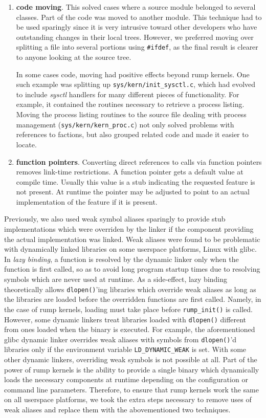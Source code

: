 \begin{enumerate}
\item   \textbf{code moving}.  This solved cases where a source
	module belonged to several classes.  Part of the code was
	moved to another module.  This technique had to be used
	sparingly since it is very intrusive toward other developers
	who have outstanding changes in their local trees.  However,
	we preferred moving over splitting a file into several
	portions using \texttt{\#ifdef}, as the final result is
	clearer to anyone looking at the source tree.

	In some cases code, moving had positive effects beyond rump
	kernels.  One such example was splitting up
	\verb+sys/kern/init_sysctl.c+, which had evolved to include
	\textit{sysctl} handlers for many different pieces of
	functionality.  For example, it contained the routines
	necessary to retrieve a process listing.  Moving the process
	listing routines to the source file dealing with process
	management (\verb+sys/kern/kern_proc.c+) not only solved
	problems with references to factions, but also
	grouped related code and made it easier to locate.

\item   \textbf{function pointers}.  Converting direct references
	to calls via function pointers removes link-time restrictions.
	A function pointer gets a default value at compile time.
	Usually this value is a stub indicating the requested feature is
	not present.  At runtime the pointer may be adjusted to
	point to an actual implementation of the feature if it is
	present.
\end{enumerate}

Previously, we also used weak symbol aliases sparingly to provide stub
implementations which were overriden by the linker if the component
providing the actual implementation was linked.  Weak aliases were
found to be problematic with dynamically linked libraries on some
userspace platforms, \eg Linux with glibc.  In \textit{lazy binding},
a function is resolved by the dynamic linker only when the function
is first called, so as to avoid long program startup times due to resolving
symbols which are never used at runtime.  As a side-effect, lazy binding
theoretically allows \texttt{dlopen()}'ing libraries which override weak
aliases as long as the libraries are loaded before the overridden functions
are first called.  Namely, in the case of rump kernels, loading must
take place before \verb+rump_init()+ is called.  However, some dynamic
linkers treat libraries loaded with \texttt{dlopen()} different from
ones loaded when the binary is executed.  For example, the aforementioned
glibc dynamic linker overrides weak aliases with symbols from
\texttt{dlopen()}'d libraries only if the environment variable
\verb+LD_DYNAMIC_WEAK+ is set.  With some other dynamic linkers,
overriding weak symbols is not possible at all.  Part of the power of
rump kernels is the ability to provide a single binary which dynamically
loads the necessary components at runtime depending on the configuration
or command line parameters.  Therefore, to ensure that rump kernels work
the same on all userspace platforms, we took the extra steps necessary
to remove uses of weak aliases and replace them with the abovementioned
two techniques.

